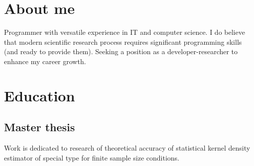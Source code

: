 \documentclass[12pt,a4paper]{moderncv}
\begin{document}
\makecvtitle

\section{About me}
Programmer with versatile experience in IT and computer science.
I do believe that modern scientific research process requires significant programming skills (and ready to provide them).
Seeking a position as a developer-researcher to enhance my career growth.

\section{Education}

\subsection{Master thesis}
Work is dedicated to research of theoretical accuracy of statistical kernel density estimator of special type for finite sample size conditions.
\end{document}
